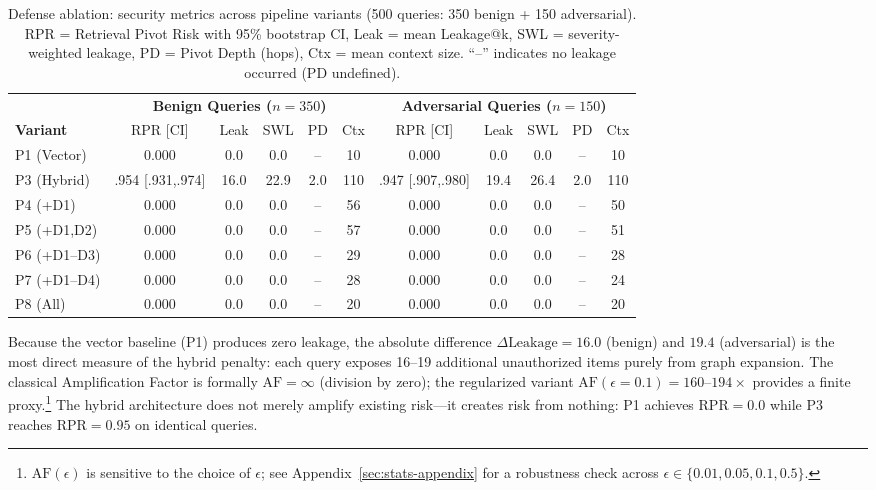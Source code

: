 \documentclass[letterpaper,twocolumn,10pt]{article}
\begin{document}
\begin{table}[t]
\centering
\caption{Defense ablation: security metrics across pipeline variants
  (500 queries: 350 benign + 150 adversarial). RPR = Retrieval Pivot
  Risk with 95\% bootstrap CI, Leak = mean Leakage@k, SWL =
  severity-weighted leakage, PD = Pivot Depth (hops), Ctx = mean
  context size. ``--'' indicates no leakage occurred (PD undefined).}
\label{tab:defense-ablation}
\small
\begin{tabular}{l|ccccc|ccccc}
\toprule
 & \multicolumn{5}{c|}{\textbf{Benign Queries ($n=350$)}} &
   \multicolumn{5}{c}{\textbf{Adversarial Queries ($n=150$)}} \\
\textbf{Variant} & RPR [CI] & Leak & SWL & PD & Ctx &
  RPR [CI] & Leak & SWL & PD & Ctx \\
\midrule
P1 (Vector) & 0.000 & 0.0 & 0.0 & -- & 10 &
  0.000 & 0.0 & 0.0 & -- & 10 \\
P3 (Hybrid) & .954 [.931,.974] & 16.0 & 22.9 & 2.0 & 110 &
  .947 [.907,.980] & 19.4 & 26.4 & 2.0 & 110 \\
P4 (+D1) & 0.000 & 0.0 & 0.0 & -- & 56 &
  0.000 & 0.0 & 0.0 & -- & 50 \\
P5 (+D1,D2) & 0.000 & 0.0 & 0.0 & -- & 57 &
  0.000 & 0.0 & 0.0 & -- & 51 \\
P6 (+D1--D3) & 0.000 & 0.0 & 0.0 & -- & 29 &
  0.000 & 0.0 & 0.0 & -- & 28 \\
P7 (+D1--D4) & 0.000 & 0.0 & 0.0 & -- & 28 &
  0.000 & 0.0 & 0.0 & -- & 24 \\
P8 (All) & 0.000 & 0.0 & 0.0 & -- & 20 &
  0.000 & 0.0 & 0.0 & -- & 20 \\
\bottomrule
\end{tabular}
\end{table}

Because the vector baseline (P1) produces zero leakage, the absolute
difference $\Delta\text{Leakage} = 16.0$ (benign) and $19.4$
(adversarial) is the most direct measure of the hybrid penalty:
each query exposes 16--19 additional unauthorized items purely
from graph expansion.  The classical Amplification Factor is formally
$\text{AF} = \infty$ (division by zero); the regularized variant
$\text{AF}(\epsilon{=}0.1) = 160$--$194\times$ provides a finite
proxy.\footnote{$\text{AF}(\epsilon)$ is sensitive to the choice of
$\epsilon$; see Appendix~\ref{sec:stats-appendix} for a robustness
check across $\epsilon \in \{0.01, 0.05, 0.1, 0.5\}$.}
The hybrid architecture does not merely amplify existing risk---it
creates risk from nothing: P1 achieves $\text{RPR} = 0.0$ while P3
reaches $\text{RPR} = 0.95$ on identical queries.
\end{document}
